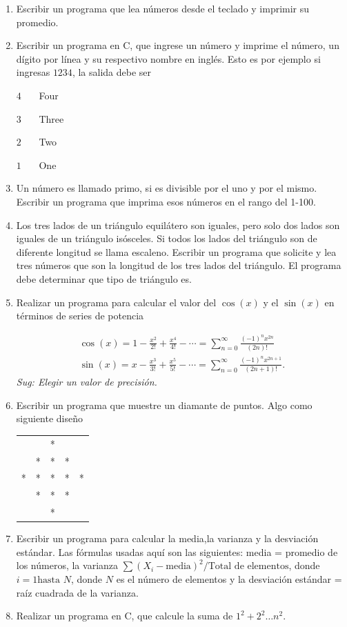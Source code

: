 \documentclass[11pt,a4paper]{article}
\newcounter{num}
\begin{document}
\begin{enumerate}
\item Escribir un programa que lea n\'umeros desde el teclado y imprimir su promedio.

\item Escribir un programa en C, que ingrese un n\'umero y imprime el n\'umero, un d\'igito por l\'inea y su respectivo nombre en ingl\'es. Esto es por ejemplo si ingresas $1234$, la salida debe ser 

$4$  \ \ \ Four

$3$   \ \ \ Three

$2$  \ \ \ Two

$1$   \ \ \ One

\item Un n\'umero es llamado primo, si es divisible por el uno y por el mismo. Escribir un programa que imprima esos n\'umeros en el rango del 1-100.
\item Los tres lados de un tri\'angulo equil\'atero son iguales, pero solo dos lados son iguales de un tri\'angulo is\'osceles. Si todos los lados del tri\'angulo son de diferente longitud se llama escaleno. Escribir un programa que solicite y lea tres n\'umeros que son la longitud de los tres lados del tri\'angulo. El programa debe determinar que tipo de tri\'angulo es.

\item Realizar un programa para calcular el valor del $\cos(x)$ y el $\sin(x)$ en t\'erminos de series de potencia

\begin{align*}
\cos(x) = 1 - \frac{x^2}{2!} + \frac{x^4}{4!} -\cdots = \sum_{n = 0}^{\infty}{\frac{(-1)^nx^{2n}}{(2n)!}}\\
\sin(x) = x- \frac{x^3}{3!} + \frac{x^5}{5!}- \cdots = \sum_{n = 0}^{\infty}{\frac{(-1)^nx^{2n + 1}}{(2n + 1)!}}.
\end{align*}
\textit{Sug: Elegir un valor de precisi\'on.}
\item Escribir un programa que muestre un diamante de puntos. Algo como  siguiente dise\~no

\begin{center}
\begin{tabular}{ccccc}
 &&*&&\\
 &*&*&*&\\
 *&*&*&*&*\\
 &*&*&*&\\
 &&*&&\\ 
\end{tabular}
\end{center} 
\item Escribir un programa para calcular la media,la varianza y la desviaci\'on est\'andar. Las f\'ormulas usadas aqu\'i son las siguientes: media = promedio de los n\'umeros, la \mbox {varianza} $\sum (X_i - \text{media})^2/\text{Total de elementos}$, donde $i = 1  \text{hasta } N$, donde $N$ es el n\'umero de \mbox{elementos} y la desviaci\'on est\'andar = ra\'iz cuadrada de la varianza. 
\item Realizar un programa en C, que calcule la suma de $1^2 + 2^2 \dots n^2$.
\end{enumerate}
\end{document}
